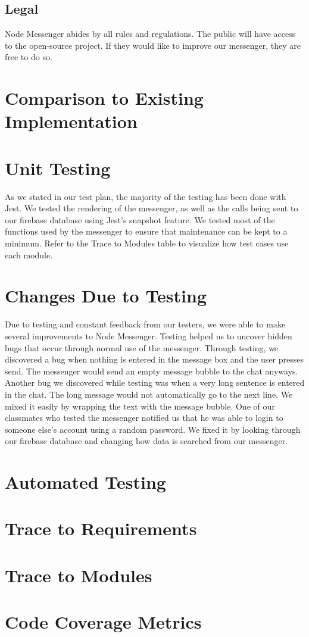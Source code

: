 \documentclass[12pt, titlepage]{article}
\begin{document}
	\subsection{Legal}
	Node Messenger abides by all rules and regulations. The public will have access to the open-source project. If they would like to improve our messenger, they are free to do so.  
	
\section{Comparison to Existing Implementation}	

\section{Unit Testing}
As we stated in our test plan, the majority of the testing has been done with Jest. We tested the rendering of the messenger, as well as the calls being sent to our firebase database using Jest’s snapshot feature. We tested most of the functions used by the messenger to ensure that maintenance can be kept to a minimum. Refer to the Trace to Modules table to visualize how test cases use each module.

\section{Changes Due to Testing}
Due to testing and constant feedback from our testers, we were able to make several improvements to Node Messenger. Testing helped us to uncover hidden bugs that occur through normal use of the messenger. Through testing, we discovered a bug when nothing is entered in the message box and the user presses send. The messenger would send an empty message bubble to the chat anyways. Another bug we discovered while testing was when a very long sentence is entered in the chat. The long message would not automatically go to the next line. We mixed it easily by wrapping the text with the message bubble. One of our classmates who tested the messenger notified us that he was able to login to someone else’s account using a random password. We fixed it by looking through our firebase database and changing how data is searched from our messenger. 

\section{Automated Testing}
		
\section{Trace to Requirements}
		
\section{Trace to Modules}		

\section{Code Coverage Metrics}




\end{document}
